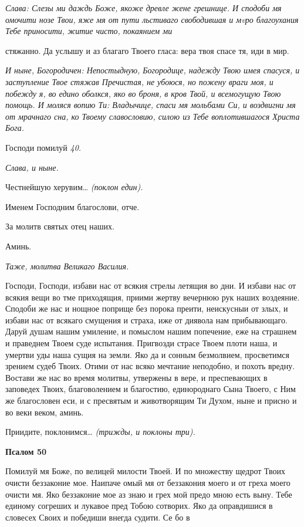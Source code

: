  \itshape Слава:\normalfont{} Слезы ми даждь Боже, якоже древле жене грешнице. И
сподоби мя омочити нозе Твои, яже мя от пути льстиваго свободившая
и мvро благоухания Тебе приносити, житие чисто, покаянием ми

стяжанно. Да услышу и аз благаго Твоего гласа: вера твоя спасе тя, иди в
мир.


 \itshape И ныне, Богородичен:\normalfont{} Непостыдную, Богородице, надежду Твою имея
спасуся, и заступление Твое стяжав Пречистая, не убоюся, но пожену враги
моя, и побежду я, во едино оболкся, яко во броня, в кров Твой, и
всемогущую Твою помощь. И моляся вопию Ти: Владычице, спаси мя
мольбами Си, и воздвигни мя от мрачнаго сна, ко Твоему славословию,
силою из Тебе воплотившагося Христа Бога.


   Господи помилуй \itshape 40\normalfont{}.


 \itshape Слава, и ныне\normalfont{}.


   Честнейшую херувим… \itshape (поклон един)\normalfont{}.


   Именем Господним благослови, отче.


   За молитв святых отец наших.


   Аминь.


 \itshape Таже, молитва Великаго Василия.\normalfont{}


   Господи, Господи, избави нас от всякия стрелы летящия во дни. И избави
нас от всякия вещи во тме приходящия, приими жертву вечернюю рук
наших воздеяние. Сподоби же нас и нощное поприще без порока преити,
неискусныи от злых, и избави нас от всякаго смущения и страха, иже от
диявола нам прибывающаго. Даруй душам нашим умиление, и помыслом
нашим попечение, еже на страшнем и праведнем Твоем суде испытания.
Пригвозди страсе Твоем плоти наша, и умертви уды наша сущия на земли.
Яко да и сонным безмолвием, просветимся зрением судеб Твоих. Отими от
нас всяко мечтание неподобно, и похоть вредну. Востави же нас во время
молитвы, утвержены в вере, и преспевающих в заповедех Твоих,
благоволением и благостию, единороднаго Сына Твоего, с Ним же
благословен еси, и с пресвятым и животворящим Ти Духом, ныне и присно и
во веки веком, аминь.


   Приидите, поклонимся… \itshape (трижды, и поклоны три)\normalfont{}.






 

\bfseries Псалом 50\normalfont{}


   Помилуй мя Боже, по велицей милости Твоей. И по множеству щедрот
Твоих очисти беззаконие мое. Наипаче омый мя от беззакония моего и от
греха моего очисти мя. Яко беззаконие мое аз знаю и грех мой предо мною
есть выну. Тебе единому согреших и лукавое пред Тобою сотворих. Яко да
оправдишися в словесех Своих и победиши внегда судити. Се бо в


